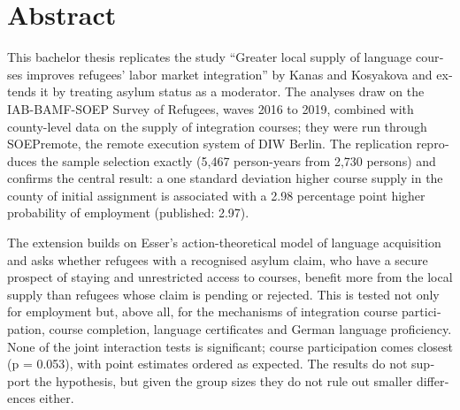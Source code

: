 \chapter*{Abstract}

\begin{otherlanguage}{english}
\noindent
This bachelor thesis replicates the study ``Greater local supply of language courses improves refugees' labor market integration'' by Kanas and Kosyakova and extends it by treating asylum status as a moderator. The analyses draw on the IAB-BAMF-SOEP Survey of Refugees, waves 2016 to 2019, combined with county-level data on the supply of integration courses; they were run through SOEPremote, the remote execution system of DIW Berlin. The replication reproduces the sample selection exactly (5,467 person-years from 2,730 persons) and confirms the central result: a one standard deviation higher course supply in the county of initial assignment is associated with a 2.98 percentage point higher probability of employment (published: 2.97).

The extension builds on Esser's action-theoretical model of language acquisition and asks whether refugees with a recognised asylum claim, who have a secure prospect of staying and unrestricted access to courses, benefit more from the local supply than refugees whose claim is pending or rejected. This is tested not only for employment but, above all, for the mechanisms of integration course participation, course completion, language certificates and German language proficiency. None of the joint interaction tests is significant; course participation comes closest (p = 0.053), with point estimates ordered as expected. The results do not support the hypothesis, but given the group sizes they do not rule out smaller differences either.
\end{otherlanguage}

